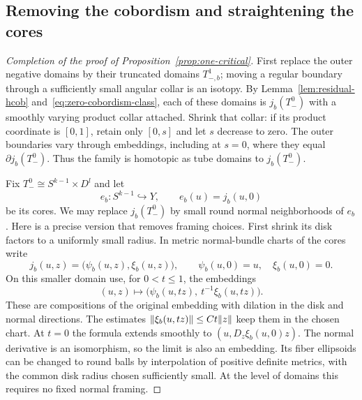 \subsection{Removing the cobordism and straightening the cores}

\begin{proof}[Completion of the proof of Proposition~\ref{prop:one-critical}]
First replace the outer negative domains by their truncated domains $T_{-,b}^1$; moving a regular boundary through a sufficiently small angular collar is an isotopy. By Lemma~\ref{lem:residual-hcob} and~\eqref{eq:zero-cobordism-class}, each of these domains is $j_b(T_-^0)$ with a smoothly varying product collar attached. Shrink that collar: if its product coordinate is $[0,1]$, retain only $[0,s]$ and let $s$ decrease to zero. The outer boundaries vary through embeddings, including at $s=0$, where they equal $\partial j_b(T_-^0)$. Thus the family is homotopic as tube domains to $j_b(T_-^0)$.

Fix $T_-^0\cong S^{k-1}\times D^l$ and let
\[
 e_b:S^{k-1}\hookrightarrow Y,\qquad e_b(u)=j_b(u,0)
\]
be its cores. We may replace $j_b(T_-^0)$ by small round normal neighborhoods of $e_b$. Here is a precise version that removes framing choices. First shrink its disk factors to a uniformly small radius. In metric normal-bundle charts of the cores write
\[
 j_b(u,z)=\bigl(\psi_b(u,z),\xi_b(u,z)\bigr),\qquad
 \psi_b(u,0)=u,\quad \xi_b(u,0)=0.
\]
On this smaller domain use, for $0<t\leq1$, the embeddings
\begin{equation}\label{eq:normal-linearization}
 (u,z)\longmapsto
 \bigl(\psi_b(u,tz),\ t^{-1}\xi_b(u,tz)\bigr).
\end{equation}
These are compositions of the original embedding with dilation in the disk and normal directions. The estimates $\lVert\xi_b(u,tz)\rVert\leq Ct\lVert z\rVert$ keep them in the chosen chart. At $t=0$ the formula extends smoothly to $(u,D_z\xi_b(u,0)z)$. The normal derivative is an isomorphism, so the limit is also an embedding. Its fiber ellipsoids can be changed to round balls by interpolation of positive definite metrics, with the common disk radius chosen sufficiently small. At the level of domains this requires no fixed normal framing.


\end{proof}
